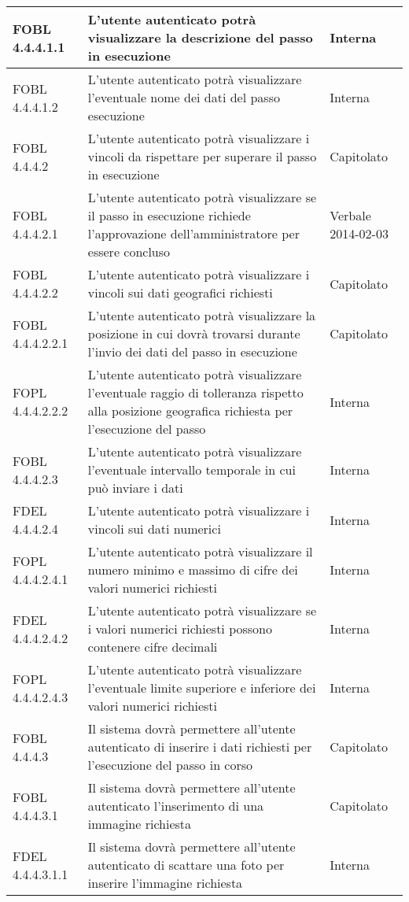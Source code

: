 \begin{longtable}{lXp{}}
\midrule
FOBL 4.4.4.1.1&L'utente autenticato potrà visualizzare la descrizione del passo in esecuzione&Interna\\
\midrule
FOBL 4.4.4.1.2&L'utente autenticato potrà visualizzare l'eventuale nome dei dati del passo esecuzione&Interna\\
\midrule
FOBL 4.4.4.2&L'utente autenticato potrà visualizzare i vincoli da rispettare per superare il passo in esecuzione&Capitolato\\
\midrule
FOBL 4.4.4.2.1&L'utente autenticato potrà visualizzare se il passo in esecuzione richiede l'approvazione dell'amministratore per essere concluso&Verbale 2014-02-03\\
\midrule
FOBL 4.4.4.2.2&L'utente autenticato potrà visualizzare i vincoli sui dati geografici richiesti&Capitolato\\
\midrule
FOBL 4.4.4.2.2.1&L'utente autenticato potrà visualizzare la posizione in cui dovrà trovarsi durante l'invio dei dati del passo in esecuzione&Capitolato\\
\midrule
FOPL 4.4.4.2.2.2&L'utente autenticato potrà visualizzare l'eventuale raggio di tolleranza rispetto alla posizione geografica richiesta per l'esecuzione del passo&Interna\\
\midrule
FOBL 4.4.4.2.3&L'utente autenticato potrà visualizzare l'eventuale intervallo temporale in cui può inviare i dati&Interna\\
\midrule
FDEL 4.4.4.2.4&L'utente autenticato potrà visualizzare i vincoli sui dati numerici&Interna\\
\midrule
FOPL 4.4.4.2.4.1&L'utente autenticato potrà visualizzare il numero minimo e massimo di cifre dei valori numerici richiesti&Interna\\
\midrule
FDEL 4.4.4.2.4.2&L'utente autenticato potrà visualizzare se i valori numerici richiesti possono contenere cifre decimali&Interna\\
\midrule
FOPL 4.4.4.2.4.3&L'utente autenticato potrà visualizzare l'eventuale limite superiore e inferiore dei valori numerici richiesti&Interna\\
\midrule
FOBL 4.4.4.3&Il sistema dovrà permettere all'utente autenticato di inserire i dati richiesti per l'esecuzione del passo in corso&Capitolato\\
\midrule
FOBL 4.4.4.3.1&Il sistema dovrà permettere all'utente autenticato l'inserimento di una immagine richiesta&Capitolato\\
\midrule
FDEL 4.4.4.3.1.1&Il sistema dovrà permettere all'utente autenticato di scattare una foto per inserire l'immagine richiesta&Interna\\

\end{longtable}
